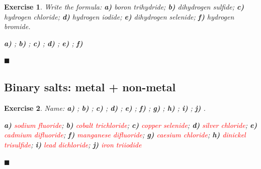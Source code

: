 \documentclass[12pt]{article}
\theoremstyle{mygreennumbox}
\newtheorem{ejercicioT}{Exercise}[section]
\newenvironment{exercise}{\begin{eBoxmygreen}\begin{ejercicioT}}{\hfill{\color{mygreen}\tiny\ensuremath{\blacksquare}}\end{ejercicioT}\end{eBoxmygreen}}
\begin{document}
\begin{exercise}
    Write the formula: \textbf{a)} boron trihydride; \textbf{b)} dihydrogen sulfide; \textbf{c)} hydrogen chloride; \textbf{d)} hydrogen iodide; \textbf{e)} dihydrogen selenide; \textbf{f)} hydrogen bromide.
    \begin{solu}
        \textbf{a)} \textcolor{red}{}; \textbf{b)} \textcolor{red}{}; \textbf{c)} \textcolor{red}{}; \textbf{d)} \textcolor{red}{}; \textbf{e)} \textcolor{red}{}; \textbf{f)} \textcolor{red}{}
    \end{solu}
\end{exercise}

\subsection{Binary salts: metal + non-metal}

\begin{exercise}
    Name: \textbf{a)} ; \textbf{b)} ; \textbf{c)} ; \textbf{d)} ; \textbf{e)} ; \textbf{f)} ; \textbf{g)} ; \textbf{h)} ; \textbf{i)} ; \textbf{j)} .
    \begin{solu}
        \textbf{a)} \textcolor{red}{sodium fluoride}; \textbf{b)} \textcolor{red}{cobalt trichloride}; \textbf{c)} \textcolor{red}{copper selenide}; \textbf{d)} \textcolor{red}{silver chloride}; \textbf{e)} \textcolor{red}{cadmium difluoride}; \textbf{f)} \textcolor{red}{manganese difluoride}; \textbf{g)} \textcolor{red}{caesium chloride}; \textbf{h)} \textcolor{red}{dinickel trisulfide}; \textbf{i)} \textcolor{red}{lead dichloride}; \textbf{j)} \textcolor{red}{iron triiodide}
    \end{solu}
\end{exercise}
\end{document}
